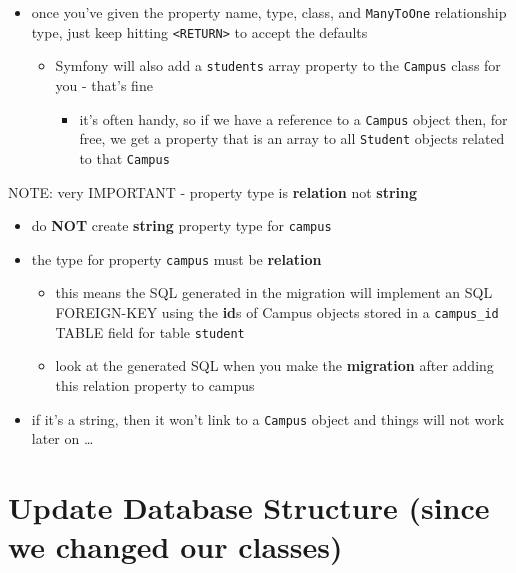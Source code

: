 \documentclass[a4paperpaper,openright]{book}
\providecommand{\tightlist}{%
  \setlength{\itemsep}{0pt}\setlength{\parskip}{0pt}}
\begin{document}
\begin{itemize}
\item
  once you've given the property name, type, class, and
  \texttt{ManyToOne} relationship type, just keep hitting
  \texttt{\textless{}RETURN\textgreater{}} to accept the defaults

  \begin{itemize}
  \item
    Symfony will also add a \texttt{students} array property to the
    \texttt{Campus} class for you - that's fine

    \begin{itemize}
    \tightlist
    \item
      it's often handy, so if we have a reference to a \texttt{Campus}
      object then, for free, we get a property that is an array to all
      \texttt{Student} objects related to that \texttt{Campus}
    \end{itemize}
  \end{itemize}
\end{itemize}

NOTE: very IMPORTANT - property type is \textbf{relation} not
\textbf{string}

\begin{itemize}
\item
  do \textbf{NOT} create \textbf{string} property type for
  \texttt{campus}
\item
  the type for property \texttt{campus} must be \textbf{relation}

  \begin{itemize}
  \item
    this means the SQL generated in the migration will implement an SQL
    FOREIGN-KEY using the \textbf{id}s of Campus objects stored in a
    \texttt{campus\_id} TABLE field for table \texttt{student}
  \item
    look at the generated SQL when you make the \textbf{migration} after
    adding this relation property to campus
  \end{itemize}
\item
  if it's a string, then it won't link to a \texttt{Campus} object and
  things will not work later on \ldots{}
\end{itemize}

\hypertarget{update-database-structure-since-we-changed-our-classes}{%
\section{Update Database Structure (since we changed our
classes)}\label{update-database-structure-since-we-changed-our-classes}}
\end{document}
